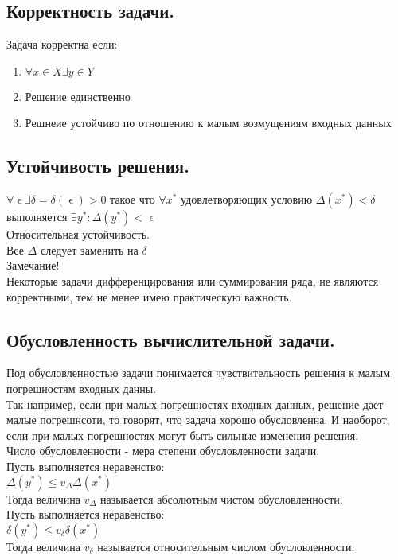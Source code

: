 \documentclass[16pt]{article}
\begin{document}
			\subsection{Корректность задачи.}
			Задача корректна если:
			\begin{enumerate}
				\item{$\forall x\in X \exists y\in Y$}
				\item{Решение единственно}
				\item{Решнеие устойчиво по отношению к малым возмущениям входных данных}
			\end{enumerate}
			\subsection{Устойчивость решения.} 
			$\forall \upvarepsilon \exists \delta=\delta(\upvarepsilon)>0$ такое что $\forall x^{*}$ удовлетворяющих условию $\Delta(x^{*})<\delta$ выполняется $\exists y^{*}: \Delta(y^{*})<\upvarepsilon$\\
			Относительная устойчивость.\\
			Все $\Delta$ следует заменить на $\delta$\\
			Замечание!\\
			Некоторые задачи дифференцирования или суммирования ряда, не являются корректными, тем не менее имею практическую важность.\\
			\subsection{Обусловленность вычислительной задачи.}
			Под обусловленностью задачи понимается чувствительность решения к малым погрешностям входных данны.\\
			Так например, если при малых погрешностях входных данных, решение дает малые погрешнсоти, то говорят, что задача хорошо обусловленна. И наоборот, если при малых погрешностях могут быть сильные изменения решения.\\
			Число обусловленности - мера степени обусловленности задачи.\\
			Пусть выполняется неравенство:\\
			$\Delta (y^{*}) \leq v_\Delta \Delta(x^{*})$\\
			Тогда величина $v_\Delta$ называется абсолютным чистом обусловленности.\\
			Пусть выполняется неравенство:\\
			$\delta (y^{*}) \leq v_\delta \delta(x^{*})$\\
			Тогда величина $v_\delta$ называется относительным числом обусловленности.\\
\end{document}
